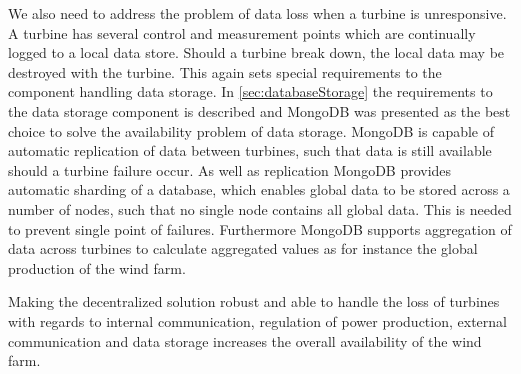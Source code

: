 We also need to address the problem of data loss when a turbine is unresponsive. A turbine has several control and measurement points which are continually logged to a local data store. Should a turbine break down, the local data may be destroyed with the turbine. This again sets special requirements to the component handling data storage. In \cref{sec:databaseStorage} the requirements to the data storage component is described and MongoDB was presented as the best choice to solve the availability problem of data storage. MongoDB is capable of automatic replication of data between turbines, such that data is still available should a turbine failure occur. As well as replication MongoDB provides automatic sharding of a database, which enables global data to be stored across a number of nodes, such that no single node contains all global data. This is needed to prevent single point of failures. Furthermore MongoDB supports aggregation of data across turbines to calculate aggregated values as for instance the global production of the wind farm.

Making the decentralized solution robust and able to handle the loss of turbines with regards to internal communication, regulation of power production, external communication and data storage increases the overall availability of the wind farm. 

\clearpage